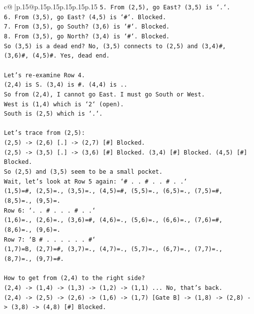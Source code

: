 \documentclass{article}
\begin{document}
{\begin{supertabular}{c@{$\;$}|p{.15\linewidth}@{}p{.15\linewidth}p{.15\linewidth}p{.15\linewidth}p{.15\linewidth}p{.15\linewidth}}
{{{\texttt{5. From (2,5), go East? (3,5) is `.`.} \\
\texttt{6. From (3,5), go East? (4,5) is `\#`. Blocked.} \\
\texttt{7. From (3,5), go South? (3,6) is `\#`. Blocked.} \\
\texttt{8. From (3,5), go North? (3,4) is `\#`. Blocked.} \\
\texttt{So (3,5) is a dead end? No, (3,5) connects to (2,5) and (3,4)\#, (3,6)\#, (4,5)\#. Yes, dead end.} \\
\\ 
\texttt{Let's re{-}examine Row 4.} \\
\texttt{(2,4) is S. (3,4) is \#. (4,4) is ..} \\
\texttt{So from (2,4), I cannot go East. I must go South or West.} \\
\texttt{West is (1,4) which is `2` (open).} \\
\texttt{South is (2,5) which is `.`.} \\
\\ 
\texttt{Let's trace from (2,5):} \\
\texttt{(2,5) {-}> (2,6) {[}.{]} {-}> (2,7) {[}\#{]} Blocked.} \\
\texttt{(2,5) {-}> (3,5) {[}.{]} {-}> (3,6) {[}\#{]} Blocked. (3,4) {[}\#{]} Blocked. (4,5) {[}\#{]} Blocked.} \\
\texttt{So (2,5) and (3,5) seem to be a small pocket.} \\
\texttt{Wait, let's look at Row 5 again: `\# . . \# . . \# . .`} \\
\texttt{(1,5)=\#, (2,5)=., (3,5)=., (4,5)=\#, (5,5)=., (6,5)=., (7,5)=\#, (8,5)=., (9,5)=.} \\
\texttt{Row 6: `. . \# . . . \# . .`} \\
\texttt{(1,6)=., (2,6)=., (3,6)=\#, (4,6)=., (5,6)=., (6,6)=., (7,6)=\#, (8,6)=., (9,6)=.} \\
\texttt{Row 7: `B \# . . . . . . \#`} \\
\texttt{(1,7)=B, (2,7)=\#, (3,7)=., (4,7)=., (5,7)=., (6,7)=., (7,7)=., (8,7)=., (9,7)=\#.} \\
\\ 
\texttt{How to get from (2,4) to the right side?} \\
\texttt{(2,4) {-}> (1,4) {-}> (1,3) {-}> (1,2) {-}> (1,1) ... No, that's back.} \\
\texttt{(2,4) {-}> (2,5) {-}> (2,6) {-}> (1,6) {-}> (1,7) {[}Gate B{]} {-}> (1,8) {-}> (2,8) {-}> (3,8) {-}> (4,8) {[}\#{]} Blocked.} \\
}}}
\end{supertabular}}
\end{document}
